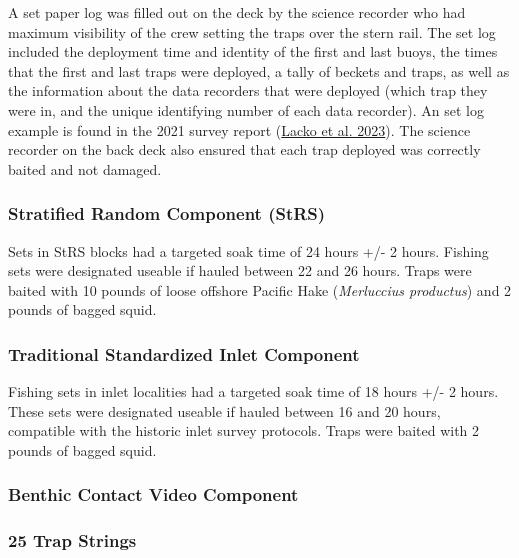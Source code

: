 \documentclass[12pt]{article}\usepackage[]{graphicx}\usepackage[]{color}
\begin{document}
A set paper log was filled out on the deck by the science recorder who had maximum visibility of the crew setting the traps over the stern rail. The set log included the deployment time and identity of the first and last buoys, the times that the first and last traps were deployed, a tally of beckets and traps, as well as the information about the data recorders that were deployed (which trap they were in, and the unique identifying number of each data recorder). An set log example is found in the 2021 survey report (\protect\hyperlink{ref-Lacko2023}{Lacko et al. 2023}). The science recorder on the back deck also ensured that each trap deployed was correctly baited and not damaged.

\hypertarget{stratified-random-component-strs}{%
\subsubsection{Stratified Random Component (StRS)}\label{stratified-random-component-strs}}

Sets in StRS blocks had a targeted soak time of 24 hours +/- 2 hours. Fishing sets were designated useable if hauled between 22 and 26 hours. Traps were baited with 10 pounds of loose offshore Pacific Hake (\emph{Merluccius productus}) and 2 pounds of bagged squid.

\hypertarget{traditional-standardized-inlet-component}{%
\subsubsection{Traditional Standardized Inlet Component}\label{traditional-standardized-inlet-component}}

Fishing sets in inlet localities had a targeted soak time of 18 hours +/- 2 hours. These sets were designated useable if hauled between 16 and 20 hours, compatible with the historic inlet survey protocols. Traps were baited with 2 pounds of bagged squid.

\hypertarget{benthic-contact-video-component}{%
\subsubsection{Benthic Contact Video Component}\label{benthic-contact-video-component}}

\hypertarget{trap-strings}{%
\subsubsection{25 Trap Strings}\label{trap-strings}}
\end{document}
